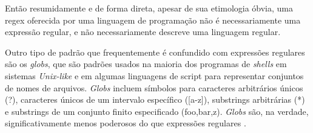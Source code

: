 Então resumidamente e de forma direta, apesar de sua etimologia óbvia, uma regex oferecida por uma linguagem de programação não é necessariamente uma expressão regular, e não necessariamente descreve uma linguagem regular.

Outro tipo de padrão que frequentemente é confundido com expressões regulares são os \textit{globs}, que são padrões usados na maioria dos programas de \textit{shells} em  sistemas \textit{Unix-like} e em algumas linguagens de script para representar conjuntos de nomes de arquivos. \textit{Globs} incluem símbolos para caracteres arbitrários únicos (?), caracteres únicos de um intervalo específico ([a-z]), substrings arbitrárias (*) e substrings de um conjunto finito especificado ({foo,ba{r,z}}). \textit{Globs} são, na verdade, significativamente menos poderosos do que expressões regulares \cite{erickson2014}.






